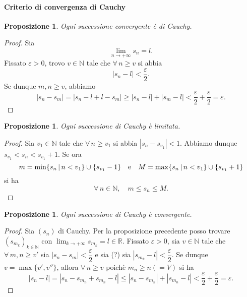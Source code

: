 \documentclass{article}
\theoremstyle{plain}
\newtheorem{prop}[thm]{Proposizione}
\theoremstyle{definition}
\theoremstyle{remark}
\begin{document}
\vspace{10pt}

\paragraph{Criterio di convergenza di Cauchy}
\begin{bxthm}
\begin{prop}
    Ogni successione convergente è di Cauchy.
\end{prop}
\end{bxthm}
\begin{proof}
    Sia \[\lim_{n\to+\infty}s_n=l. \]
    Fissato $\varepsilon>0$, trovo $v\in\mathbb{N}$ tale che $\forall\, n\geq v$ si abbia \[|s_n-l|<\dfrac{\varepsilon}{2}.\]
    Se dunque $m,n\geq v$, abbiamo \[|s_n-s_m|=|s_n-l+l-s_m|\geq|s_n-l|+|s_m-l|<\dfrac{\varepsilon}{2}+\dfrac{\varepsilon}{2}=\varepsilon.\]
\end{proof}

\vspace{10pt}

\begin{bxthm}
\begin{prop}
    Ogni successione di Cauchy è limitata.
\end{prop}
\end{bxthm}
\begin{proof}
    Sia $v_1\in\mathbb{N}$ tale che $\forall\,n\geq v_1$ si abbia $|s_n-s_{v_1}|<1$.
    Abbiamo dunque $s_{v_1}<s_n<s_{v_1}+1$. Se ora 
    \[m=\min\{s_n\,|\,n<v_1\}\cup\{s_{v_1}-1\}\quad\textup{e}\quad M=\max\{s_n\,|\,n<v_1\}\cup\{s_{v_1}+1\} \]
    si ha \[\forall\,n\in\mathbb{N},\quad m\leq s_n\leq M.\]
\end{proof}

\vspace{10pt}

\begin{bxthm}
\begin{prop}
    Ogni successione di Cauchy è convergente.
\end{prop}
\end{bxthm}
\begin{proof}
    Sia $(s_n)$ di Cauchy. 
    Per la proposizione precedente posso trovare $(s_{m_k})_{k\in\mathbb{N}}$ con $\lim_{k\to+\infty}s_{m_k}=l\in\mathbb{R}$.
    Fissato $\varepsilon>0$, sia $v\in\mathbb{N}$ tale che $\forall\,m,n\geq v'$ sia $|s_n-s_m|<\dfrac{\varepsilon}{2}$ e sia (?) sia $|s_{m_k}-l|<\dfrac{\varepsilon}{2}$.
    Se dunque $v=\max\{v',v''\}$, allora $\forall\,n\geq v$ poichè $m_n\geq n(=V)$ si ha 
    \[|s_n-l|=|s_n-s_{m_n}+s_{m_n}-l|\leq|s_n-s_{m_n}|+|s_{m_n}-l|<\dfrac{\varepsilon}{2}+\dfrac{\varepsilon}{2}=\varepsilon.\]
\end{proof}
\end{document}
